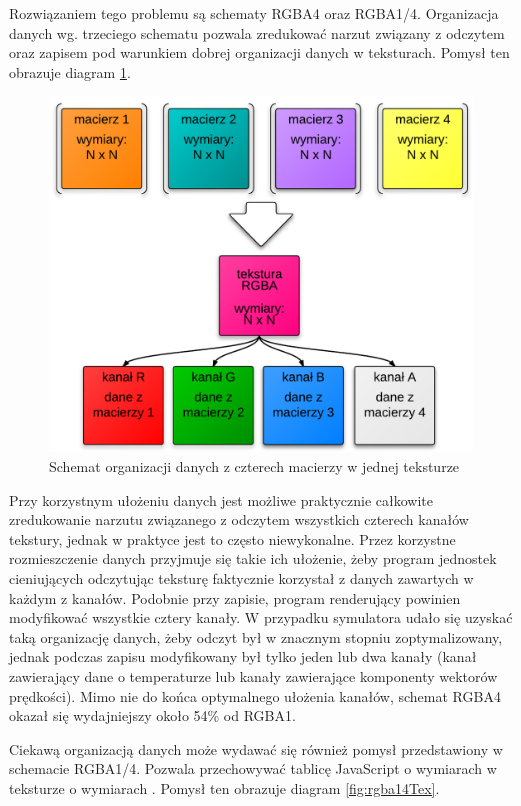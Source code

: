 Rozwiązaniem tego problemu są schematy RGBA4 oraz RGBA1/4. Organizacja danych
wg. trzeciego schematu pozwala zredukować narzut związany z odczytem oraz
zapisem pod warunkiem dobrej organizacji danych w teksturach. Pomysł ten
obrazuje diagram \ref{fig:rgba4Tex}. 

\begin{figure}[!h]
\centering
\includegraphics[width=.9\textwidth]{img/rgba4Tex}
\caption{Schemat organizacji danych z czterech macierzy w jednej teksturze}
\label{fig:rgba4Tex}
\end{figure}

Przy korzystnym ułożeniu danych jest możliwe praktycznie całkowite zredukowanie
narzutu związanego z odczytem wszystkich czterech kanałów tekstury, jednak w
praktyce jest to często niewykonalne. Przez korzystne rozmieszczenie danych
przyjmuje się takie ich ułożenie, żeby program jednostek cieniujących odczytując
teksturę faktycznie korzystał z danych zawartych w każdym z kanałów. Podobnie
przy zapisie, program renderujący powinien modyfikować wszystkie cztery kanały.
W przypadku symulatora  udało się uzyskać taką organizację danych,
żeby odczyt był w znacznym stopniu zoptymalizowany, jednak podczas zapisu
modyfikowany był tylko jeden lub dwa kanały (kanał zawierający dane o
temperaturze lub kanały zawierające komponenty wektorów prędkości). Mimo nie do
końca optymalnego ułożenia kanałów, schemat RGBA4 okazał się wydajniejszy około
54\% od RGBA1.

Ciekawą organizacją danych może wydawać się również pomysł przedstawiony w
schemacie RGBA1/4. Pozwala przechowywać tablicę JavaScript o wymiarach 
w teksturze o wymiarach . Pomysł ten obrazuje diagram
\ref{fig:rgba14Tex}.

